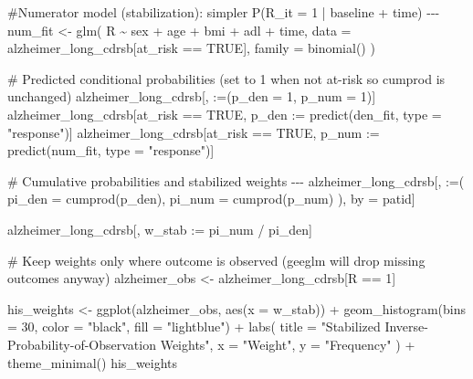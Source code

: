 \documentclass[
  9pt,
  letterpaper,
  DIV=11,
  numbers=noendperiod]{scrartcl}
\newenvironment{Shaded}{\begin{snugshade}}{\end{snugshade}}
\newcommand{\AttributeTok}[1]{\textcolor[rgb]{0.40,0.45,0.13}{#1}}
\newcommand{\CommentTok}[1]{\textcolor[rgb]{0.37,0.37,0.37}{#1}}
\newcommand{\ConstantTok}[1]{\textcolor[rgb]{0.56,0.35,0.01}{#1}}
\newcommand{\DecValTok}[1]{\textcolor[rgb]{0.68,0.00,0.00}{#1}}
\newcommand{\ErrorTok}[1]{\textcolor[rgb]{0.68,0.00,0.00}{#1}}
\newcommand{\FunctionTok}[1]{\textcolor[rgb]{0.28,0.35,0.67}{#1}}
\newcommand{\NormalTok}[1]{\textcolor[rgb]{0.00,0.23,0.31}{#1}}
\newcommand{\OtherTok}[1]{\textcolor[rgb]{0.00,0.23,0.31}{#1}}
\newcommand{\SpecialCharTok}[1]{\textcolor[rgb]{0.37,0.37,0.37}{#1}}
\newcommand{\StringTok}[1]{\textcolor[rgb]{0.13,0.47,0.30}{#1}}
\begin{document}
\begin{Shaded}
\begin{Highlighting}[]
\CommentTok{\#Numerator model (stabilization): simpler P(R\_it = 1 | baseline + time) {-}{-}{-}}
\NormalTok{num\_fit }\OtherTok{\textless{}{-}} \FunctionTok{glm}\NormalTok{(}
\NormalTok{  R }\SpecialCharTok{\textasciitilde{}}\NormalTok{ sex }\SpecialCharTok{+}\NormalTok{ age }\SpecialCharTok{+}\NormalTok{ bmi }\SpecialCharTok{+}\NormalTok{ adl }\SpecialCharTok{+}\NormalTok{ time,}
  \AttributeTok{data   =}\NormalTok{ alzheimer\_long\_cdrsb[at\_risk }\SpecialCharTok{==} \ConstantTok{TRUE}\NormalTok{],}
  \AttributeTok{family =} \FunctionTok{binomial}\NormalTok{()}
\NormalTok{)}

\CommentTok{\# Predicted conditional probabilities (set to 1 when not at{-}risk so cumprod is unchanged)}
\NormalTok{alzheimer\_long\_cdrsb[, }\StringTok{\textasciigrave{}}\AttributeTok{:=}\StringTok{\textasciigrave{}}\NormalTok{(}\AttributeTok{p\_den =} \DecValTok{1}\NormalTok{, }\AttributeTok{p\_num =} \DecValTok{1}\NormalTok{)]}
\NormalTok{alzheimer\_long\_cdrsb[at\_risk }\SpecialCharTok{==} \ConstantTok{TRUE}\NormalTok{, p\_den }\SpecialCharTok{:}\ErrorTok{=} \FunctionTok{predict}\NormalTok{(den\_fit, }\AttributeTok{type =} \StringTok{"response"}\NormalTok{)]}
\NormalTok{alzheimer\_long\_cdrsb[at\_risk }\SpecialCharTok{==} \ConstantTok{TRUE}\NormalTok{, p\_num }\SpecialCharTok{:}\ErrorTok{=} \FunctionTok{predict}\NormalTok{(num\_fit, }\AttributeTok{type =} \StringTok{"response"}\NormalTok{)]}

\CommentTok{\# Cumulative probabilities and stabilized weights {-}{-}{-}}
\NormalTok{alzheimer\_long\_cdrsb[, }\StringTok{\textasciigrave{}}\AttributeTok{:=}\StringTok{\textasciigrave{}}\NormalTok{(}
  \AttributeTok{pi\_den =} \FunctionTok{cumprod}\NormalTok{(p\_den),}
  \AttributeTok{pi\_num =} \FunctionTok{cumprod}\NormalTok{(p\_num)}
\NormalTok{), by }\OtherTok{=}\NormalTok{ patid]}

\NormalTok{alzheimer\_long\_cdrsb[, w\_stab }\SpecialCharTok{:}\ErrorTok{=}\NormalTok{ pi\_num }\SpecialCharTok{/}\NormalTok{ pi\_den]}

\CommentTok{\# Keep weights only where outcome is observed (geeglm will drop missing outcomes anyway)}
\NormalTok{alzheimer\_obs }\OtherTok{\textless{}{-}}\NormalTok{ alzheimer\_long\_cdrsb[R }\SpecialCharTok{==} \DecValTok{1}\NormalTok{]}

\NormalTok{his\_weights }\OtherTok{\textless{}{-}} \FunctionTok{ggplot}\NormalTok{(alzheimer\_obs, }\FunctionTok{aes}\NormalTok{(}\AttributeTok{x =}\NormalTok{ w\_stab)) }\SpecialCharTok{+}
  \FunctionTok{geom\_histogram}\NormalTok{(}\AttributeTok{bins =} \DecValTok{30}\NormalTok{, }\AttributeTok{color =} \StringTok{"black"}\NormalTok{, }\AttributeTok{fill =} \StringTok{"lightblue"}\NormalTok{) }\SpecialCharTok{+}
  \FunctionTok{labs}\NormalTok{(}
    \AttributeTok{title =} \StringTok{"Stabilized Inverse{-}Probability{-}of{-}Observation Weights"}\NormalTok{,}
    \AttributeTok{x     =} \StringTok{"Weight"}\NormalTok{,}
    \AttributeTok{y     =} \StringTok{"Frequency"}
\NormalTok{  ) }\SpecialCharTok{+}
  \FunctionTok{theme\_minimal}\NormalTok{()}
\NormalTok{his\_weights}



\end{Highlighting}
\end{Shaded}
\end{document}
